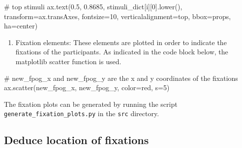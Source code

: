 \documentclass[
  a4paper,
]{article}
\newenvironment{Shaded}{}{}
\newcommand{\CommentTok}[1]{\textcolor[rgb]{0.42,0.45,0.49}{#1}}
\newcommand{\DecValTok}[1]{\textcolor[rgb]{0.00,0.36,0.77}{#1}}
\newcommand{\FloatTok}[1]{\textcolor[rgb]{0.00,0.36,0.77}{#1}}
\newcommand{\NormalTok}[1]{\textcolor[rgb]{0.14,0.16,0.18}{#1}}
\newcommand{\OperatorTok}[1]{\textcolor[rgb]{0.14,0.16,0.18}{#1}}
\newcommand{\StringTok}[1]{\textcolor[rgb]{0.01,0.18,0.38}{#1}}
\providecommand{\tightlist}{%
  \setlength{\itemsep}{0pt}\setlength{\parskip}{0pt}}\usepackage{longtable,booktabs,array}
\begin{document}
\begin{Shaded}
\begin{Highlighting}[]
\CommentTok{\# top stimuli}
\NormalTok{ax.text(}\FloatTok{0.5}\NormalTok{, }\FloatTok{0.8685}\NormalTok{, stimuli\_dict[i][}\DecValTok{0}\NormalTok{].lower(), transform}\OperatorTok{=}\NormalTok{ax.transAxes, fontsize}\OperatorTok{=}\DecValTok{10}\NormalTok{,}
\NormalTok{    verticalalignment}\OperatorTok{=}\StringTok{\textquotesingle{}top\textquotesingle{}}\NormalTok{, bbox}\OperatorTok{=}\NormalTok{props, ha}\OperatorTok{=}\StringTok{\textquotesingle{}center\textquotesingle{}}\NormalTok{)}
\end{Highlighting}
\end{Shaded}

\begin{enumerate}
\def\labelenumi{\arabic{enumi}.}
\setcounter{enumi}{1}
\tightlist
\item
  Fixation elements: These elements are plotted in order to indicate the
  fixations of the participants. As indicated in the code block below,
  the matplotlib scatter function is used.
\end{enumerate}

\begin{Shaded}
\begin{Highlighting}[]
\CommentTok{\# new\_fpog\_x and new\_fpog\_y are the x and y coordinates of the fixations}
\NormalTok{ax.scatter(new\_fpog\_x, new\_fpog\_y, color}\OperatorTok{=}\StringTok{\textquotesingle{}red\textquotesingle{}}\NormalTok{, s}\OperatorTok{=}\DecValTok{5}\NormalTok{)}
\end{Highlighting}
\end{Shaded}

\begin{tcolorbox}[enhanced jigsaw, toprule=.15mm, colbacktitle=quarto-callout-note-color!10!white, opacityback=0, rightrule=.15mm, colframe=quarto-callout-note-color-frame, coltitle=black, titlerule=0mm, breakable, colback=white, arc=.35mm, opacitybacktitle=0.6, bottomrule=.15mm, bottomtitle=1mm, leftrule=.75mm, toptitle=1mm, title=\textcolor{quarto-callout-note-color}{\faInfo}\hspace{0.5em}{Nota Bene}, left=2mm]

The fixation plots can be generated by running the script
\texttt{generate\_fixation\_plots.py} in the \texttt{src} directory.

\end{tcolorbox}

\hypertarget{deduce-location-of-fixations}{%
\subsection{Deduce location of
fixations}\label{deduce-location-of-fixations}}
\end{document}
